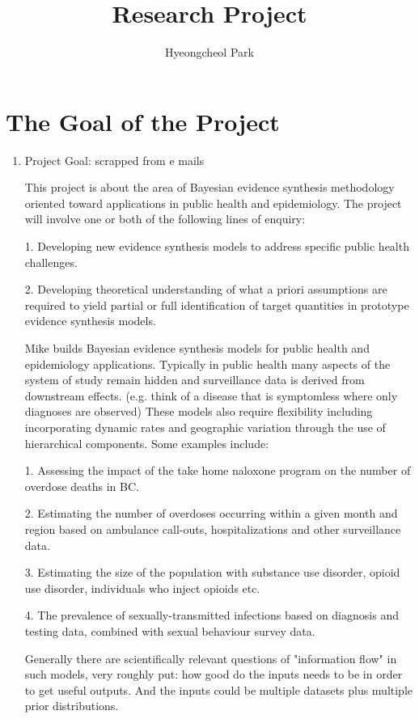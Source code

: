 \documentclass[]{article}
\title{Research Project}
\author{Hyeongcheol Park}
\begin{document}
\maketitle


\section{The Goal of the Project}

\begin{enumerate}

	\item{Project Goal: scrapped from e mails}
	
	
	This project is about the area of Bayesian evidence synthesis methodology oriented toward applications in public health and epidemiology.  The project will involve one or both of the following lines of enquiry:
	
	1. Developing new evidence synthesis models to address specific public health challenges.
	
	2. Developing theoretical understanding of what a priori assumptions are required to yield partial or full identification of target quantities in prototype evidence synthesis models.
	
	Mike builds Bayesian evidence synthesis models for public health and epidemiology applications. Typically in public health many aspects of the system of study remain hidden and surveillance data is derived from downstream effects. (e.g. think of a disease that is symptomless where only diagnoses are observed) These models also require flexibility including incorporating dynamic rates and geographic variation through the use of hierarchical components. Some examples include:
	
	1. Assessing the impact of the take home naloxone program on the number of overdose deaths in BC.
	
	2. Estimating the number of overdoses occurring within a given month and region based on ambulance call-outs, hospitalizations and other surveillance data.
	
	3. Estimating the size of the population with substance use disorder, opioid use disorder, individuals who inject opioids etc.
	
	4. The prevalence of sexually-transmitted infections based on diagnosis and testing data, combined with sexual behaviour survey data.
	
	Generally there are scientifically relevant questions of "information flow" in such models, very roughly put: how good do the inputs needs to be in order to get useful outputs. And the inputs could be multiple datasets plus multiple prior distributions.
	

\end{enumerate}
\end{document}
